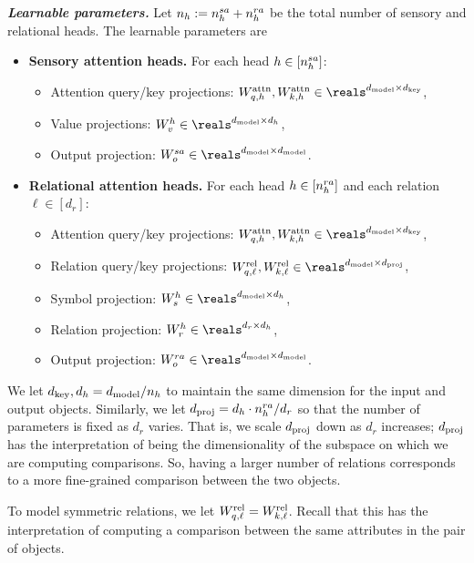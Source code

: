 \textit{\textbf{Learnable parameters.}} Let $n_h := n_h^{sa} + n_h^{ra}$ be the total number of sensory and relational heads. The learnable parameters are
\begin{itemize}[left=5pt]
    \item \textbf{Sensory attention heads.} For each head $h \in [n_h^{sa}]$:
    \begin{itemize}[label=$\circ$]
        \item Attention query/key projections: $\Wqattnn{h}, \Wkattnn{h} \in \reals^{\dmodel \times \dkey}$, 
        \item Value projections: $W_v^h \in \reals^{\dmodel \times d_h}$,
        \item Output projection: $W_o^{sa} \in \reals^{\dmodel \times \dmodel}$.
    \end{itemize}
    \item \textbf{Relational attention heads.} For each head $h \in [n_h^{ra}]$ and each relation $\ell \in [d_r]$:
    \begin{itemize}[label=$\circ$]
        \item Attention query/key projections: $\Wqattnn{h}, \Wkattnn{h} \in \reals^{\dmodel \times \dkey}$,
        \item Relation query/key projections: $\Wqrell{\ell}, \Wkrell{\ell} \in \reals^{\dmodel \times \dproj}$,
        \item Symbol projection: $W_s^h \in \reals^{\dmodel \times d_h}$,
        \item Relation projection: $W_r^h \in \reals^{d_r \times d_h}$,
        \item Output projection: $W_o^{ra} \in \reals^{\dmodel \times \dmodel}$.
    \end{itemize}
\end{itemize}
We let $d_{\mathrm{key}}, d_h = d_{\mathrm{model}} / n_h$ to maintain the same dimension for the input and output objects. Similarly, we let $d_{\mathrm{proj}} = d_h \cdot n_h^{ra} / d_r$ so that the number of parameters is fixed as $d_r$ varies. That is, we scale $d_{\mathrm{proj}}$ down as $d_r$ increases; $d_{\mathrm{proj}}$ has the interpretation of being the dimensionality of the subspace on which we are computing comparisons. So, having a larger number of relations corresponds to a more fine-grained comparison between the two objects.

To model symmetric relations, we let $W_{q, \ell}^{\mathrm{rel}} = W_{k, \ell}^{\mathrm{rel}}$. Recall that this has the interpretation of computing a comparison between the same attributes in the pair of objects.

